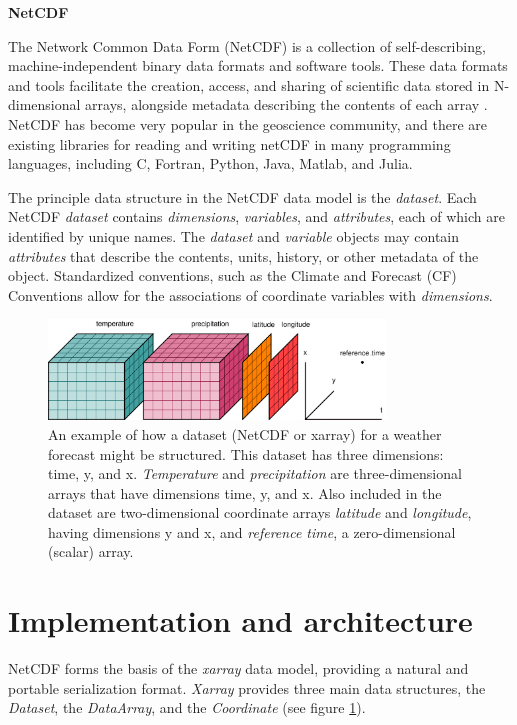 \documentclass{jors}
\begin{document}
\textbf{NetCDF}

The Network Common Data Form (NetCDF) is a collection of self-describing, machine-independent binary data formats and software tools.
These data formats and tools facilitate the creation, access, and sharing of scientific data stored in N-dimensional arrays, alongside metadata describing the contents of each array \citep{Rew_1990}.
NetCDF has become very popular in the geoscience community, and there are existing libraries for reading and writing netCDF in many programming languages, including C, Fortran, Python, Java, Matlab, and Julia.

The principle data structure in the NetCDF data model is the \textit{dataset}.
Each NetCDF \textit{dataset} contains \textit{dimensions}, \textit{variables}, and \textit{attributes}, each of which are identified by unique names.
The \textit{dataset} and \textit{variable} objects may contain \textit{attributes} that describe the contents, units, history, or other metadata of the object.
Standardized conventions, such as the Climate and Forecast (CF) Conventions \citep{eaton2003netcdf} allow for the associations of coordinate variables with \textit{dimensions}.

\begin{figure}
	\centering
	\includegraphics[width=0.8\textwidth]{dataset-diagram_original}
	\caption{An example of how a dataset (NetCDF or xarray) for a weather forecast might be structured.  This dataset has three dimensions: time, y, and x.  \textit{Temperature} and \textit{precipitation} are three-dimensional arrays that have dimensions time, y, and x.  Also included in the dataset are two-dimensional coordinate arrays \textit{latitude} and \textit{longitude}, having dimensions y and x, and \textit{reference time}, a zero-dimensional (scalar) array.}
	\label{fig:dataset_diagram}
\end{figure}

\section*{Implementation and architecture}

NetCDF forms the basis of the \textit{xarray} data model, providing a natural and portable serialization format.
\textit{Xarray} provides three main data structures, the \textit{Dataset}, the \textit{DataArray}, and the \textit{Coordinate} (see figure \ref{fig:dataset_diagram}).
\end{document}
